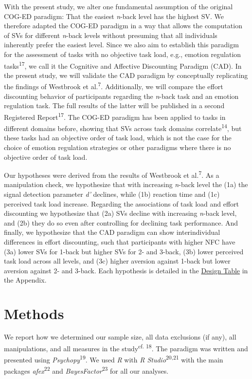 \documentclass[
  man,floatsintext]{apa6}
\begin{document}
With the present study, we alter one fundamental assumption of the original COG-ED paradigm: That the easiest \emph{n}-back level has the highest SV.
We therefore adapted the COG-ED paradigm in a way that allows the computation of SVs for different \emph{n}-back levels without presuming that all individuals inherently prefer the easiest level.
Since we also aim to establish this paradigm for the assessment of tasks with no objective task load, e.g., emotion regulation tasks\textsuperscript{17}, we call it the Cognitive and Affective Discounting Paradigm (CAD).
In the present study, we will validate the CAD paradigm by conceptually replicating the findings of Westbrook et al.\textsuperscript{7}.
Additionally, we will compare the effort discounting behavior of participants regarding the \emph{n}-back task and an emotion regulation task.
The full results of the latter will be published in a second Registered Report\textsuperscript{17}.
The COG-ED paradigm has been applied to tasks in different domains before, showing that SVs across task domains correlate\textsuperscript{14}, but these tasks had an objective order of task load, which is not the case for the choice of emotion regulation strategies or other paradigms where there is no objective order of task load.

Our hypotheses were derived from the results of Westbrook et al.\textsuperscript{7}.
As a manipulation check, we hypothesize that with increasing \emph{n}-back level the (1a) the signal detection parameter \emph{d'} declines, while (1b) reaction time and (1c) perceived task load increase.
Regarding the associations of task load and effort discounting we hypothesize that (2a) SVs decline with increasing \emph{n}-back level, and (2b) they do so even after controlling for declining task performance.
And finally, we hypothesize that the CAD paradigm can show interindividual differences in effort discounting, such that participants with higher NFC have (3a) lower SVs for 1-back but higher SVs for 2- and 3-back, (3b) lower perceived task load across all levels, and (3c) higher aversion against 1-back but lower aversion against 2- and 3-back.
Each hypothesis is detailed in the \protect\hyperlink{DesignTableSection}{Design Table} in the Appendix.

\hypertarget{methods}{%
\section{Methods}\label{methods}}

We report how we determined our sample size, all data exclusions (if any), all manipulations, and all measures in the study\textsuperscript{cf. 18}.
The paradigm was written and presented using \emph{Psychopy}\textsuperscript{19}.
We used \emph{R} with \emph{R Studio}\textsuperscript{20,21} with the main packages \emph{afex}\textsuperscript{22} and \emph{BayesFactor}\textsuperscript{23} for all our analyses.
\end{document}
